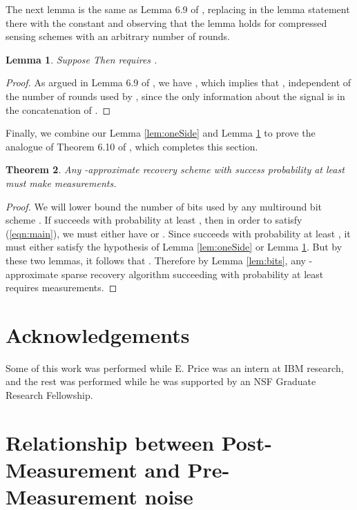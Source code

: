 \documentclass[twoside,leqno,twocolumn]{article}
\newtheorem{theorem}{Theorem}[section]
\newtheorem{lemma}[theorem]{Lemma}
\begin{document}
The next lemma is the same as Lemma 6.9 of \cite{PW11}, replacing
 in the lemma statement there with the constant  and
observing that the lemma holds for compressed sensing schemes with an
arbitrary number of rounds. \begin{lemma}\label{lem:noise}
  Suppose   Then
   requires .
\end{lemma}
\begin{proof}
  As argued in Lemma 6.9 of \cite{PW11}, we have , which implies that , independent of the number  of rounds used by
  , since the only information about the signal is in the concatenation
  of . 
\end{proof}
Finally, we combine our Lemma \ref{lem:oneSide} and Lemma
\ref{lem:noise} to prove the analogue of Theorem 6.10 of \cite{PW11},
which completes this section. \begin{theorem}\label{thm:conclusion}
  Any -approximate  recovery scheme with
  success probability at least  must make
   measurements.
\end{theorem}
\begin{proof}
  We will lower bound the number of bits used by any  multiround bit scheme
  . If  succeeds with probability at least ,
  then in order to satisfy (\ref{eqn:main}), we must either have
   or
  . Since  succeeds with probability at least
  , it must either satisfy the hypothesis of Lemma
  \ref{lem:oneSide} or Lemma \ref{lem:noise}. But by these two lemmas,
  it follows that . Therefore by Lemma
  \ref{lem:bits}, any -approximate  sparse
  recovery algorithm succeeding with probability at least  requires 
  measurements.
\end{proof}

\section{Acknowledgements}

Some of this work was performed while E. Price was an intern at IBM
research, and the rest was performed while he was supported by an NSF
Graduate Research Fellowship.

\newpage





\appendix

\section{Relationship between Post-Measurement and Pre-Measurement
  noise}\label{app:noisekind}
\end{document}
